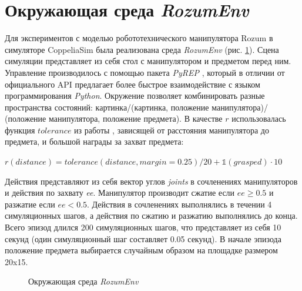 \documentclass{mipt-thesis-bs}
\begin{document}
\section{Окружающая среда \textit{RozumEnv}}

Для экспериментов с моделью робототехнического манипулятора Rozum в симуляторе CoppeliaSim была реализована среда \textit{RozumEnv} (рис. \ref{rozum}). Сцена симуляции представляет из себя стол с манипулятором и предметом перед ним. Управление производилось с помощью пакета \textit{PyREP} \cite{pyrep}, который в отличии от официального API предлагает более быстрое взаимодействие с языком программирования \textit{Python}. Окружение позволяет комбинировать разные пространства состояний: картинка/(картинка, положение манипулятора)/ (положение манипулятора, положение предмета). В качестве $r$ использовалась функция $tolerance$ из работы \cite{deepmind suite}, зависящей от расстояния манипулятора до предмета, и большой награды за захват предмета:
\begin{center}
$r(distance) = tolerance(distance, margin=0.25)/20 + \mathds{1}(grasped)\cdot 10$
\end{center}

Действия представляют из себя вектор углов \textit{joints} в сочленениях манипуляторов и действия по захвату \textit{ee}. Манипулятор производит сжатие если $ee\geq 0.5$ и разжатие если $ee< 0.5$. Действия в сочленениях выполнялись в течении 4 симуляционных шагов, а действия по сжатию и разжатию выполнялись до конца. Всего эпизод длился 200 симуляционных шагов, что представляет из себя 10 секунд (один симуляционный шаг составляет 0.05 секунд). В начале эпизода положение предмета выбирается случайным образом на площадке размером 20x15.


\begin{figure}[ht]
    \centering
    \vspace{-0.2cm}
    \label{rozum}
    \caption{Окружающая среда \textit{RozumEnv}}
\end{figure}
\end{document}
